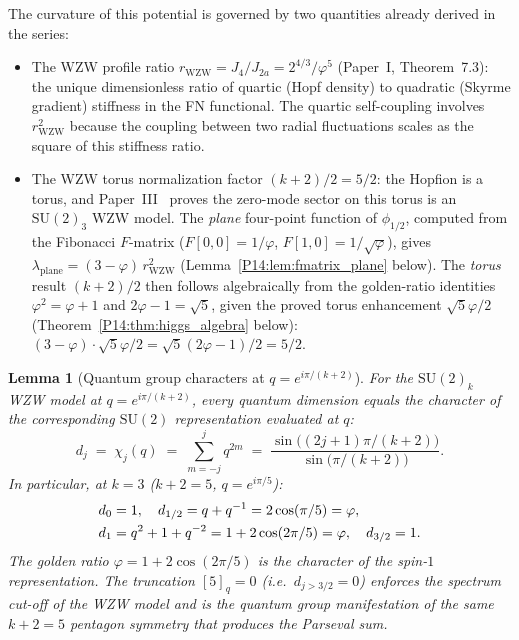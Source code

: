 \documentclass[11pt,a4paper]{article}
\newtheorem{lemma}[theorem]{Lemma}
\theoremstyle{definition}
\theoremstyle{remark}
\newcommand{\vp}{\varphi}
\newcommand{\Jfour}{J_4}
\newcommand{\Ja}{J_{2a}}
\begin{document}
The curvature of this potential is governed by two quantities already
derived in the series:
\begin{itemize}[noitemsep]
\item The WZW profile ratio $r_{\mathrm{WZW}} = \Jfour/\Ja = 2^{4/3}/\vp^5$
  (Paper~I, Theorem~7.3): the unique dimensionless ratio
  of quartic (Hopf density) to quadratic (Skyrme gradient) stiffness
  in the FN functional.
  The quartic self-coupling involves $r_{\mathrm{WZW}}^2$ because the
  coupling between two radial fluctuations scales as the square of
  this stiffness ratio.
\item The WZW torus normalization factor $(k\!+\!2)/2 = 5/2$:
  the Hopfion is a torus, and Paper~III~\cite{Paper3} proves
  the zero-mode sector on this torus is an $\mathrm{SU}(2)_3$ WZW model.
  The \emph{plane} four-point function of $\phi_{1/2}$, computed from the
  Fibonacci $F$-matrix
  ($F[0,0]=1/\vp$, $F[1,0]=1/\sqrt{\vp}$),
  gives $\lambda_{\mathrm{plane}} = (3{-}\vp)\,r_{\mathrm{WZW}}^2$
  (Lemma~\ref{P14:lem:fmatrix_plane} below).
  The \emph{torus} result $(k+2)/2$ then follows algebraically
  from the golden-ratio identities $\vp^2=\vp+1$ and $2\vp-1=\sqrt{5}$,
  given the proved torus enhancement $\sqrt{5}\vp/2$
  (Theorem~\ref{P14:thm:higgs_algebra} below):
  $(3{-}\vp)\cdot\sqrt{5}\vp/2 = \sqrt{5}(2\vp-1)/2 = 5/2$.
\end{itemize}

\begin{lemma}[Quantum group characters at $q=e^{i\pi/(k+2)}$]
\label{P14:lem:qgroup_char}
For the $\mathrm{SU}(2)_k$ WZW model at $q = e^{i\pi/(k+2)}$, every quantum
dimension equals the character of the corresponding $\mathrm{SU}(2)$
representation evaluated at $q$:
\begin{equation}
  d_j \;=\; \chi_j(q) \;=\; \sum_{m=-j}^{j} q^{2m}
  \;=\; \frac{\sin\bigl((2j+1)\pi/(k+2)\bigr)}{\sin\bigl(\pi/(k+2)\bigr)}.
  \label{P14:eq:qchar}
\end{equation}
In particular, at $k=3$ ($k+2=5$, $q=e^{i\pi/5}$):
\begin{align}
  d_0 &= 1,\quad d_{1/2} = q+q^{-1} = 2\cos(\pi/5) = \vp,\notag\\
  d_1 &= q^2+1+q^{-2} = 1+2\cos(2\pi/5) = \vp,\quad
  d_{3/2} = 1.
  \label{P14:eq:qchar_k3}
\end{align}
The golden ratio $\vp = 1+2\cos(2\pi/5)$ is the character of the
spin-$1$ representation.
The truncation $[5]_q = 0$ (i.e.\ $d_{j>3/2}=0$) enforces the
spectrum cut-off of the WZW model and is the quantum group
manifestation of the same $k+2=5$ pentagon symmetry that produces
the Parseval sum.
\end{lemma}
\end{document}

